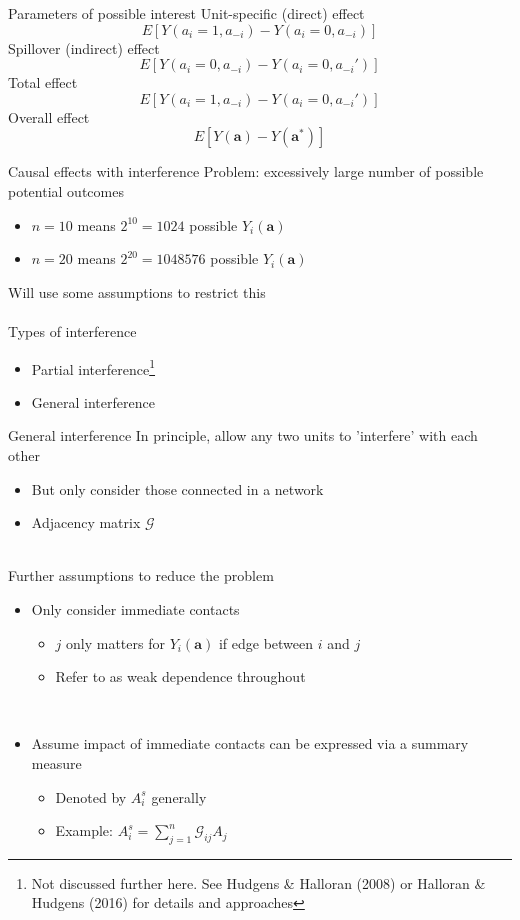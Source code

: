 \documentclass{beamer}
\begin{document}
\begin{frame}{Parameters of possible interest}
	Unit-specific (direct) effect
	\[E[Y(a_i=1, a_{-i}) - Y(a_i=0, a_{-i})]\]
	Spillover (indirect) effect
	\[E[Y(a_i=0, a_{-i}) - Y(a_i=0, a_{-i}')]\]
	Total effect
	\[E[Y(a_i=1, a_{-i}) - Y(a_i=0, a_{-i}')]\]
	Overall effect
	\[E[Y(\mathbf{a}) - Y(\mathbf{a}^*)]\]
\end{frame}

\begin{frame}{Causal effects with interference}
	Problem: excessively large number of possible potential outcomes
	\begin{itemize}
		\item $n=10$ means $2^{10} = 1024$ possible $Y_i(\mathbf{a})$
		\item $n=20$ means $2^{20} = 1048576$ possible $Y_i(\mathbf{a})$
	\end{itemize}
	Will use some assumptions to restrict this\\~\\
	Types of interference
	\begin{itemize}
		\item Partial interference\footnote[frame]{Not discussed further here. See Hudgens \& Halloran (2008) or Halloran \& Hudgens (2016) for details and approaches}
		\item General interference
	\end{itemize}
\end{frame}

\begin{frame}{General interference}
	In principle, allow any two units to 'interfere' with each other
	\begin{itemize}
		\item But only consider those connected in a network
		\item Adjacency matrix $\mathcal{G}$
	\end{itemize}~\\
	Further assumptions to reduce the problem
	\begin{itemize}
		\item Only consider immediate contacts
		\begin{itemize}
			\item $j$ only matters for $Y_i(\mathbf{a})$ if edge between $i$ and $j$
			\item Refer to as weak dependence throughout
		\end{itemize}~\\
		\item Assume impact of immediate contacts can be expressed via a summary measure
		\begin{itemize}
			\item Denoted by $A_i^s$ generally
			\item Example: $A_i^s = \sum_{j=1}^{n} \mathcal{G}_{ij} A_j$
		\end{itemize}
	\end{itemize}
\end{frame}
\end{document}
